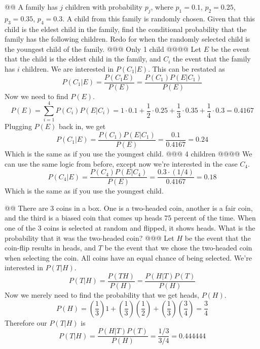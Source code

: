 \documentclass[10pt]{article}
\begin{document}
\begin{easylist}[enumerate]
    @@ A family has $j$ children with probability $p_j$, where $p_1 = 0.1$, $p_2 = 0.25$, $p_3 = 0.35$, $p_4 = 0.3$. A
    child from this family is randomly chosen. Given that this child is the eldest child in the family, find the
    conditional probability that the family has the following children. Redo for when the randomly selected child is the
    youngest child of the family.
    @@@ Only 1 child
    @@@@ Let $E$ be the event that the child is the eldest child in the family, and $C_i$ the event that the family has
    $i$ children. We are interested in $P(C_1|E)$. This
    can be restated as
        \[ P(C_1|E) = \frac{P(C_1E)}{P(E)} = \frac{P(C_1) P(E|C_1)}{P(E)} \]
    Now we need to find $P(E)$.
        \[ P(E) = \sum^4_{i=1} P(C_i) P(E|C_i) = 1 \cdot 0.1 + \frac{1}{2} \cdot 0.25 + \frac{1}{3} \cdot 0.35 +
        \frac{1}{4} \cdot 0.3 = 0.4167 \]
    Plugging $P(E)$ back in, we get
        \[ P(C_1|E) = \frac{P(C_1) P(E|C_1)}{P(E)} = \frac{0.1}{0.4167} = \boxed{0.24} \]
    Which is the same as if you use the youngest child.
    @@@ 4 children
    @@@@ We can use the same logic from before, except now we're interested in the case $C_4$.
        \[ P(C_4|E) = \frac{P(C_4) P(E|C_4)}{P(E)} = \frac{0.3 \cdot (1/4)}{0.4167} = \boxed{0.18} \]
    Which is the same as if you use the youngest child.

    @@ There are 3 coins in a box. One is a two-headed coin, another is a fair coin, and the third is a biased coin that
    comes up heads 75 percent of the time.  When one of the 3 coins is selected at random and flipped, it shows heads.
    What is the probability that it was the two-headed coin?
    @@@ Let $H$ be the event that the coin-flip results in heads, and $T$ be the event that we chose the two-headed coin
    when selecting the coin. All coins have an equal chance of being selected. We're interested in $P(T|H)$.
        \[ P(T|H) = \frac{P(TH)}{P(H)} = \frac{P(H|T) P(T)}{P(H)}\]
    Now we merely need to find the probability that we get heads, $P(H)$.
        \[ P(H) = \left( \frac{1}{3} \right) 1 +
                    \left( \frac{1}{3} \right) \left( \frac{1}{2} \right) +
                    \left( \frac{1}{3} \right) \left( \frac{3}{4} \right) =
                \frac{3}{4} \]
    Therefore our $P(T|H)$ is
        \[ P(T|H) = \frac{P(H|T) P(T)}{P(H)} = \frac{1/3}{3/4} = \boxed{0.444444} \]


\end{easylist}
\end{document}
